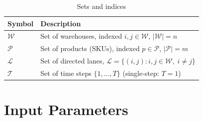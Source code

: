 \documentclass[11pt, a4paper]{article}
\begin{document}
\begin{table}[h!]
\centering
\renewcommand{\arraystretch}{1.35}
\begin{tabular}{@{}ll@{}}
\toprule
\textbf{Symbol} & \textbf{Description} \\
\midrule
$\mathcal{W}$ & Set of warehouses, indexed $i, j \in \mathcal{W}$,\;
                $|\mathcal{W}| = n$ \\
$\mathcal{P}$ & Set of products (SKUs), indexed $p \in \mathcal{P}$,\;
                $|\mathcal{P}| = m$ \\
$\mathcal{L}$ & Set of directed lanes,
                $\mathcal{L} = \{(i,j) : i,j \in \mathcal{W},\; i \neq j\}$ \\
$\mathcal{T}$ & Set of time steps $\{1, \ldots, T\}$ (single-step: $T=1$) \\
\bottomrule
\end{tabular}
\caption{Sets and indices}
\end{table}

\section{Input Parameters}
\end{document}
